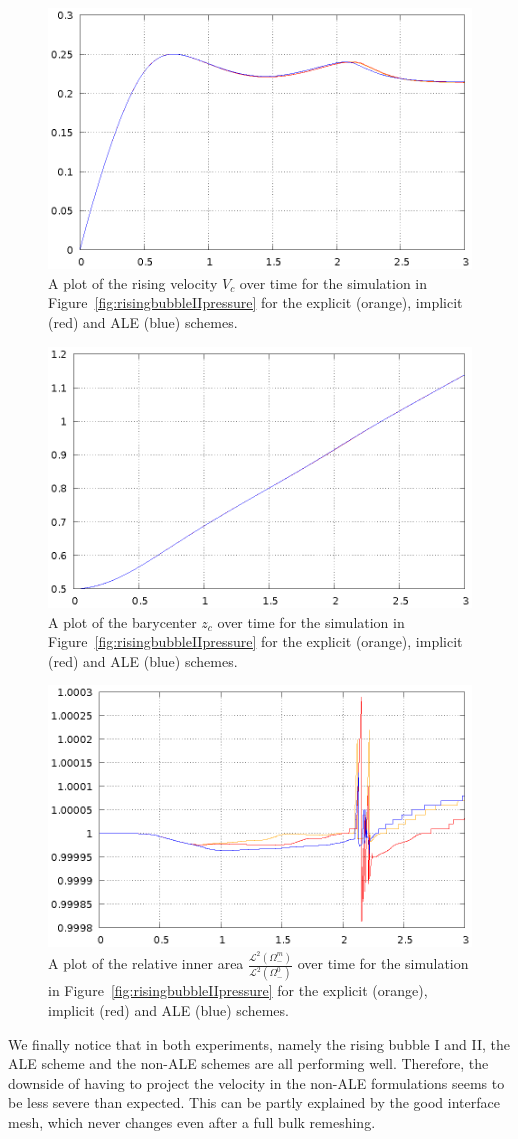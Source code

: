 \documentclass[a4paper,12pt,onecolumn]{article}
\begin{document}
\begin{figure}[htbp]
\centering
\includegraphics[width=.45\textwidth]
{figures/rising_bubble_II_rising_velocity.ps}
\caption[Navier--Stokes rising bubble II rising velocity]
{A plot of the rising velocity $V_c$ over time for the simulation in
Figure~\ref{fig:risingbubbleIIpressure} for the explicit (orange), implicit
(red) and ALE (blue) schemes.}
\label{fig:risingbubbleIIrisingvelocity}
\end{figure}

\begin{figure}[htbp]
\centering
\includegraphics[width=.45\textwidth]
{figures/rising_bubble_II_barycenter.ps}
\caption[Navier--Stokes rising bubble II barycenter]
{A plot of the barycenter $z_c$ over time for the simulation in
Figure~\ref{fig:risingbubbleIIpressure} for the explicit (orange), implicit
(red) and ALE (blue) schemes.}
\label{fig:risingbubbleIIbarycenter}
\end{figure}

\begin{figure}[htbp]
\centering
\includegraphics[width=.45\textwidth]
{figures/rising_bubble_II_inner_volume.ps}
\caption[Navier--Stokes rising bubble II inner area]
{A plot of the relative inner area
$\frac{\mathcal{L}^2(\Omega^m_-)}{\mathcal{L}^2(\Omega^0_-)}$ over time for the
simulation in Figure~\ref{fig:risingbubbleIIpressure} for the explicit
(orange), implicit (red) and ALE (blue) schemes.}
\label{fig:risingbubbleIIinnervolume}
\end{figure}

We finally notice that in both experiments, namely the rising bubble I and II,
the ALE scheme and the non-ALE schemes are all performing well. Therefore, the
downside of having to project the velocity in the non-ALE formulations seems to
be less severe than expected. This can be partly explained by the good
interface mesh, which never changes even after a full bulk remeshing.



\end{document}
